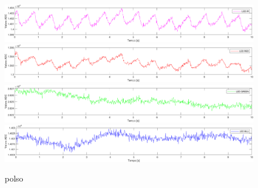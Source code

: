 \begin{figure}[tbh]
	\centering
	\includegraphics[width=0.8\linewidth]{ImageFiles/Misure Preliminari/Soggetto 1/fronte_ired}
	\includegraphics[width=0.8\linewidth]{ImageFiles/Misure Preliminari/Soggetto 1/fronte_red}
	\includegraphics[width=0.8\linewidth]{ImageFiles/Misure Preliminari/Soggetto 1/fronte_green}
	\includegraphics[width=0.8\linewidth]{ImageFiles/Misure Preliminari/Soggetto 1/fronte_blu}
	\caption{polso}
	\label{fig:Descrizione_Segnale_PPG}
\end{figure}






\clearpage